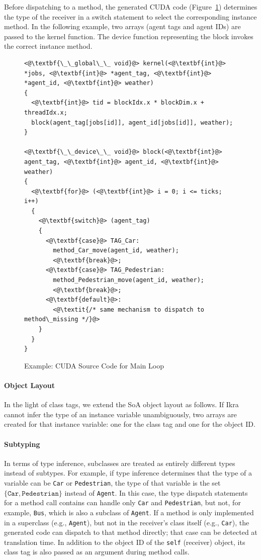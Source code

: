\documentclass[preprint]{sigplanconf}
\begin{document}
Before dispatching to a method, the generated CUDA code (Figure~\ref{fig:listing_cuda_main}) determines the type of the receiver in a switch statement to select the corresponding instance method. In the following example, two arrays (agent tags and agent IDs) are passed to the kernel function. The device function representing the block invokes the correct instance method.

\lstset{language=C++}
\begin{figure}[!htp]
\begin{lstlisting}
<@\textbf{\_\_global\_\_ void}@> kernel(<@\textbf{int}@> *jobs, <@\textbf{int}@> *agent_tag, <@\textbf{int}@> *agent_id, <@\textbf{int}@> weather)
{
  <@\textbf{int}@> tid = blockIdx.x * blockDim.x + threadIdx.x;
  block(agent_tag[jobs[id]], agent_id[jobs[id]], weather);
}

<@\textbf{\_\_device\_\_ void}@> block(<@\textbf{int}@> agent_tag, <@\textbf{int}@> agent_id, <@\textbf{int}@> weather)
{
  <@\textbf{for}@> (<@\textbf{int}@> i = 0; i <= ticks; i++)
  {
    <@\textbf{switch}@> (agent_tag)
    {
      <@\textbf{case}@> TAG_Car:
        method_Car_move(agent_id, weather);
        <@\textbf{break}@>;
      <@\textbf{case}@> TAG_Pedestrian:
        method_Pedestrian_move(agent_id, weather);
        <@\textbf{break}@>;
      <@\textbf{default}@>:
        <@\textit{/* same mechanism to dispatch to method\_missing */}@>
    }
  }
}
\end{lstlisting}
\caption{Example: CUDA Source Code for Main Loop}
\label{fig:listing_cuda_main}
\end{figure}

\paragraph{Object Layout}
In the light of class tags, we extend the SoA object layout as follows. If Ikra cannot infer the type of an instance variable unambiguously, two arrays are created for that instance variable: one for the class tag and one for the object ID.

\paragraph{Subtyping}
In terms of type inference, subclasses are treated as entirely different types instead of subtypes. For example, if type inference determines that the type of a variable can be \texttt{Car} or \texttt{Pedestrian}, the type of that variable is the set $\{\texttt{Car}, \texttt{Pedestrian}\}$ instead of \texttt{Agent}. In this case, the type dispatch statements for a method call contains can handle only \texttt{Car} and \texttt{Pedestrian}, but not, for example, \texttt{Bus}, which is also a subclass of \texttt{Agent}. If a method is only implemented in a superclass (e.g., \texttt{Agent}), but not in the receiver's class itself (e.g., \texttt{Car}), the generated code can dispatch to that method directly; that case can be detected at translation time. In addition to the object ID of the \texttt{self} (receiver) object, its class tag is also passed as an argument during method calls.
\end{document}
